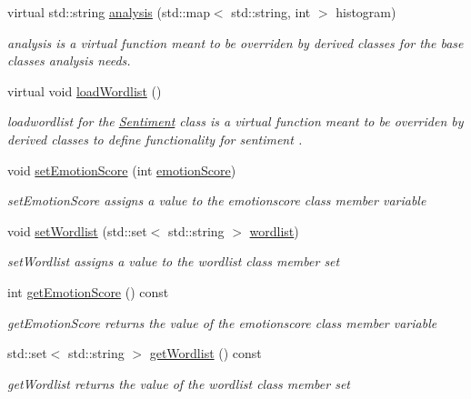 \begin{DoxyCompactItemize}
\item 
virtual std\-::string \hyperlink{classSentiment_afddbb12fdb928ae171a88debef10234a}{analysis} (std\-::map$<$ std\-::string, int $>$ histogram)
\begin{DoxyCompactList}\small\item\em analysis is a virtual function meant to be overriden by derived classes for the base classes analysis needs. \end{DoxyCompactList}\item 
\hypertarget{classSentiment_a5e7dabb641c08cadcab53bf92f2c3dde}{virtual void \hyperlink{classSentiment_a5e7dabb641c08cadcab53bf92f2c3dde}{load\-Wordlist} ()}\label{classSentiment_a5e7dabb641c08cadcab53bf92f2c3dde}

\begin{DoxyCompactList}\small\item\em loadwordlist for the \hyperlink{classSentiment}{Sentiment} class is a virtual function meant to be overriden by derived classes to define functionality for sentiment . \end{DoxyCompactList}\item 
void \hyperlink{classSentiment_aec1c59286392c42b307aade917128b45}{set\-Emotion\-Score} (int \hyperlink{classSentiment_a5a1779a5a705df433195ec737a4156ea}{emotion\-Score})
\begin{DoxyCompactList}\small\item\em set\-Emotion\-Score assigns a value to the emotionscore class member variable \end{DoxyCompactList}\item 
void \hyperlink{classSentiment_a7845d7438489c469e24ed2018b8f28cc}{set\-Wordlist} (std\-::set$<$ std\-::string $>$ \hyperlink{classSentiment_a177fabec96128aa37489b4db240535ae}{wordlist})
\begin{DoxyCompactList}\small\item\em set\-Wordlist assigns a value to the wordlist class member set \end{DoxyCompactList}\item 
\hypertarget{classSentiment_a3a88696162756d042ff19f298103fca4}{int \hyperlink{classSentiment_a3a88696162756d042ff19f298103fca4}{get\-Emotion\-Score} () const }\label{classSentiment_a3a88696162756d042ff19f298103fca4}

\begin{DoxyCompactList}\small\item\em get\-Emotion\-Score returns the value of the emotionscore class member variable \end{DoxyCompactList}\item 
\hypertarget{classSentiment_aded4e0137351e5a389a4f31be52be57b}{std\-::set$<$ std\-::string $>$ \hyperlink{classSentiment_aded4e0137351e5a389a4f31be52be57b}{get\-Wordlist} () const }\label{classSentiment_aded4e0137351e5a389a4f31be52be57b}

\begin{DoxyCompactList}\small\item\em get\-Wordlist returns the value of the wordlist class member set \end{DoxyCompactList}\end{DoxyCompactItemize}

